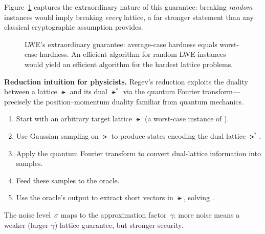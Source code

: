 Figure~\ref{fig:ch07-worst-avg} captures the extraordinary nature of this guarantee: breaking \emph{random} \lwe{} instances would imply breaking \emph{every} lattice, a far stronger statement than any classical cryptographic assumption provides.

\begin{figure}[t]
\centering
{}
\caption{LWE's extraordinary guarantee: average-case hardness equals worst-case hardness.  An efficient algorithm for random LWE instances would yield an efficient algorithm for the hardest lattice problems.}
\label{fig:ch07-worst-avg}
\end{figure}

\begin{svgraybox}
\textbf{Reduction intuition for physicists.}
Regev's reduction exploits the duality between a lattice $\lat$ and its dual $\lat^*$ via the quantum Fourier transform---precisely the position--momentum duality familiar from quantum mechanics.
\begin{enumerate}
\item Start with an arbitrary target lattice $\lat$ (a worst-case instance of \gapsvp{}).
\item Use Gaussian sampling on $\lat$ to produce states encoding the dual lattice $\lat^*$.
\item Apply the quantum Fourier transform to convert dual-lattice information into \lwe{} samples.
\item Feed these samples to the \lwe{} oracle.
\item Use the oracle's output to extract short vectors in $\lat$, solving \gapsvp{}.
\end{enumerate}
The noise level~$\sigma$ maps to the approximation factor~$\gamma$: more noise means a weaker (larger $\gamma$) lattice guarantee, but stronger \lwe{} security.
\end{svgraybox}

